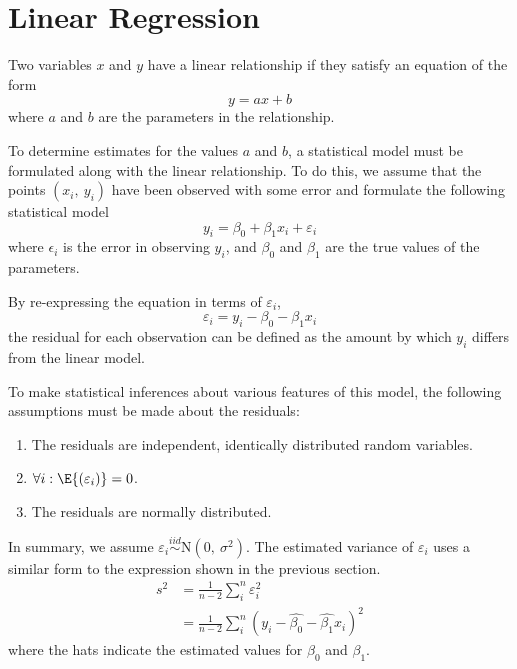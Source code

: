 \documentclass{article}
\begin{document}
\section{Linear Regression}
\begin{definition}
    Two variables $x$ and $y$ have a linear relationship if they satisfy an equation of the form
    \begin{equation*}
        y = a x + b
    \end{equation*}
    where $a$ and $b$ are the parameters in the relationship.
\end{definition}
To determine estimates for the values $a$ and $b$, a statistical model must be formulated along with the linear relationship.
To do this, we assume that the points $\left( x_i,\: y_i \right)$ have been observed with some error and formulate the following statistical model
\begin{equation*}
    y_i = \beta_0 + \beta_1 x_i + \varepsilon_i
\end{equation*}
where $\epsilon_i$ is the error in observing $y_i$, and $\beta_0$ and $\beta_1$ are the true values of the parameters.
\begin{definition}[Residual]
    By re-expressing the equation in terms of $\varepsilon_i$,
    \begin{equation*}
        \varepsilon_i = y_i - \beta_0 - \beta_1 x_i
    \end{equation*}
    the residual for each observation can be defined as the amount by which $y_i$ differs from the linear model.
\end{definition}
To make statistical inferences about various features of this model, the following assumptions must be made about the residuals:
\begin{enumerate}
    \item The residuals are independent, identically distributed random variables.
    \item $\forall i : \E{\left( \varepsilon_i \right)} = 0$.
    \item The residuals are normally distributed.
\end{enumerate}
In summary, we assume $\varepsilon_i \stackrel{iid}{\sim} \mathrm{N}\left( 0,\: \sigma^2 \right)$.
The estimated variance of $\varepsilon_i$ uses a similar form to the expression shown in the previous section.
\begin{align*}
    s^2 & = \frac{1}{n- 2} \sum_i^n \varepsilon_i^2                                          \\
        & = \frac{1}{n- 2} \sum_i^n \left( y_i - \hat{\beta_0} - \hat{\beta_1} x_i \right)^2
\end{align*}
where the hats indicate the estimated values for $\beta_0$ and $\beta_1$.
\end{document}
